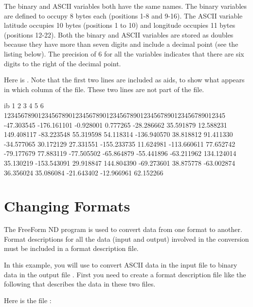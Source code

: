 The binary and ASCII variables both have the same names. The binary
variables are defined to occupy 8 bytes each (positions 1-8 and 9-16).
The ASCII variable latitude occupies 10 bytes (positions 1 to 10) and
longitude occupies 11 bytes (positions 12-22). Both the binary and
ASCII variables are stored as doubles because they have more than
seven digits and include a decimal point (see the 
listing below). The precision of 6 for all the variables indicates
that there are six digits to the right of the decimal point.

Here is .  Note that the first two lines are included
as aids, to show what appears in which column of the file.  These two
lines are not part of the file.

\begin{vcode}{ib}
         1         2         3         4         5         6
12345678901234567890123456789012345678901234567890123456789012345
-47.303545 -176.161101
 -0.928001    0.777265
-28.286662   35.591879
 12.588231  149.408117
-83.223548   55.319598
 54.118314 -136.940570
 38.818812   91.411330
-34.577065   30.172129
 27.331551 -155.233735
 11.624981 -113.660611
 77.652742  -79.177679
 77.883119  -77.505502
-65.864879  -55.441896
-63.211962  134.124014
 35.130219 -153.543091
 29.918847  144.804390
-69.273601   38.875778
-63.002874   36.356024
 35.086084  -21.643402
-12.966961   62.152266
\end{vcode}

\section{Changing Formats}

The FreeForm ND program  is used to convert data from one
format to another. Format descriptions for all the data (input and
output) involved in the conversion must be included in a format
description file.

In this example, you will use  to convert ASCII data in
the input file  to binary data in the output file
. First you need to create a format description file
like the following that describes the data in these two files.

Here is the file :

